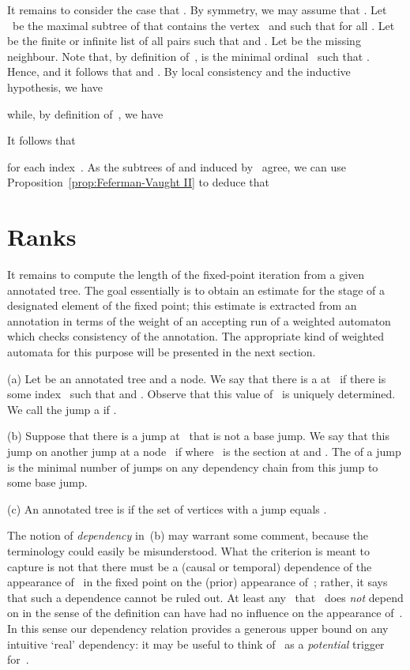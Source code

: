 \documentclass{LMCS}
\begin{document}
It remains to consider the case that .
By symmetry, we may assume that .
Let ~be the maximal subtree of 
that contains the vertex~ and
such that  for all .
Let  be the finite or infinite list
of all pairs  such that  and .
Let  be the missing neighbour.
Note that, by definition of~,  is the minimal ordinal~
such that
.
Hence,  and it follows that
 and .
By local consistency and the inductive hypothesis, we have

while, by definition of~, we have

It follows that

for each index~.
As the subtrees of
 and  induced by~ agree,
we can use Proposition~\ref{prop:Feferman-Vaught II}
to deduce that



\section{Ranks}
\label{sect:ranks}

It remains to compute the length of the fixed-point iteration from
a given annotated tree.
The goal essentially is to obtain an estimate for the stage of a designated
element of the fixed point\?; this estimate is extracted from an annotation
in terms of the weight of an accepting run of a weighted
automaton which checks consistency of the annotation.
The appropriate kind of weighted automata for this purpose will be
presented in the next section.

\begin{defi}
\textup{(a)}
Let  be an annotated tree and  a node.
We say that there is a  at~
if there is some index~ such that
 and .
Observe that this value of ~is uniquely determined.
We call the jump a  if .

\textup{(b)}
Suppose that there is a jump at~ that is not a base jump.
We say that this jump  on another jump at a node~
if  where ~is the section at  and .
The  of a jump is the minimal number of jumps
on any dependency chain from this jump to some base jump.

\textup{(c)}
An annotated tree  is 
if the set of vertices with a jump equals .
\end{defi}

The notion of \emph{dependency} in~(b) may warrant some comment, because
the terminology could easily be misunderstood. What the criterion is meant to
capture is not that there must be a (causal or temporal) dependence of the
appearance of~ in the fixed point on the (prior) appearance of~\?;
rather, it says that such a dependence cannot be ruled out.
At least any~ that ~does \emph{not} depend on in the sense of the definition can
have had no influence on the appearance of~.
In this sense our dependency relation provides a generous upper bound
on any intuitive `real' dependency\?:
it may be useful to think of ~as a \emph{potential} trigger for~.
\end{document}
